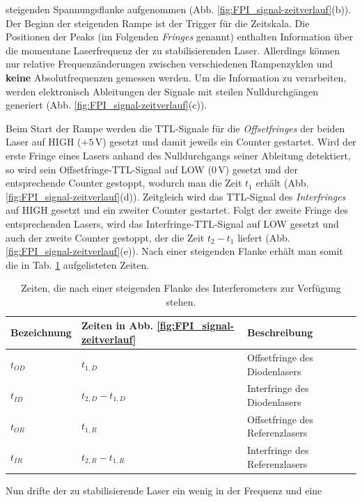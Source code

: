 steigenden Spannungsflanke aufgenommen (Abb.
\ref{fig:FPI_signal-zeitverlauf}(b)). Der Beginn der steigenden Rampe ist der
Trigger für die Zeitskala. Die Positionen der Peaks (im Folgenden
\textit{Fringes} genannt) enthalten Information über die momentane
Laserfrequenz der zu stabilisierenden Laser. Allerdings können nur relative
Frequenzänderungen zwischen verschiedenen Rampenzyklen und \textbf{keine}
Absolutfrequenzen gemessen werden. Um die Information zu verarbeiten, werden
elektronisch Ableitungen der Signale mit steilen Nulldurchgängen generiert (Abb.
\ref{fig:FPI_signal-zeitverlauf}(c)).\par
Beim Start der Rampe werden die TTL-Signale für die \textit{Offsetfringes} der
beiden Laser auf HIGH ($+5\,$V) gesetzt und damit jeweils ein Counter gestartet.
Wird der erste Fringe eines Lasers anhand des Nulldurchgangs seiner Ableitung
detektiert, so wird sein Offsetfringe-TTL-Signal auf LOW ($0\,$V) gesetzt und der
entsprechende Counter gestoppt, wodurch man die Zeit $t_1$ erhält (Abb.
\ref{fig:FPI_signal-zeitverlauf}(d)). Zeitgleich wird das TTL-Signal des
\textit{Interfringes} auf HIGH gesetzt und ein zweiter Counter gestartet.
Folgt der zweite Fringe des entsprechenden Lasers, wird das
Interfringe-TTL-Signal auf LOW gesetzt und auch der zweite Counter gestoppt,
der die Zeit $t_2-t_1$ liefert (Abb. \ref{fig:FPI_signal-zeitverlauf}(e)). Nach
einer steigenden Flanke erhält man somit die in Tab. \ref{tab:laserzeiten}
aufgelisteten Zeiten.\par
\begin{table}
	\begin{tabular}{p{}p{}p{}}
		\toprule
		Bezeichnung & Zeiten in Abb. \ref{fig:FPI_signal-zeitverlauf} & Beschreibung
		\\
		\midrule[1px]
		\hline
		$t_{OD}$ & $t_{1,D}$ & Offsetfringe des Diodenlasers \\
		$t_{ID}$ & $t_{2,D}-t_{1,D}$ & Interfringe des Diodenlasers \\
		$t_{OR}$ & $t_{1,R}$ & Offsetfringe des Referenzlasers \\
		$t_{IR}$ & $t_{2,R}-t_{1,R}$ & Interfringe des Referenzlasers \\
		\bottomrule[1px]
	\end{tabular}
	\caption[Fringezeiten]{Zeiten, die nach einer steigenden
	Flanke des Interferometers zur Verfügung stehen.}
	\label{tab:laserzeiten}
\end{table}
Nun drifte der zu stabilisierende Laser ein wenig in der Frequenz und eine
